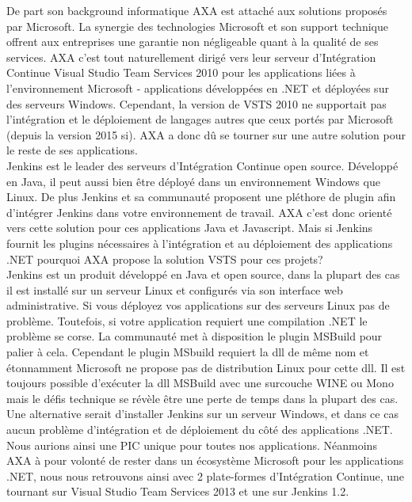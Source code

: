     De part son background informatique AXA est attaché aux solutions proposés par Microsoft. La synergie des technologies Microsoft et son support technique offrent aux entreprises une garantie non négligeable quant à la qualité de ses services. AXA c'est tout naturellement dirigé vers leur serveur d'Intégration Continue Visual Studio Team Services 2010 pour les applications liées à l'environnement Microsoft - applications développées en .NET et déployées sur des serveurs Windows. Cependant, la version de VSTS 2010 ne supportait pas l'intégration et le déploiement de langages autres que ceux portés par Microsoft (depuis la version 2015 si). AXA a donc dû se tourner sur une autre solution pour le reste de ses applications.\\

    Jenkins est le leader des serveurs d'Intégration Continue open source. Développé en Java, il peut aussi bien être déployé dans un environnement Windows que Linux. De plus Jenkins et sa communauté proposent une pléthore de plugin afin d'intégrer Jenkins dans votre environnement de travail. AXA c'est donc orienté vers cette solution pour ces applications Java et Javascript. Mais si Jenkins fournit les plugins nécessaires à l'intégration et au déploiement des applications .NET pourquoi AXA propose la solution VSTS pour ces projets?\\

    Jenkins est un produit développé en Java et open source, dans la plupart des cas il est installé sur un serveur Linux et configurés via son interface web administrative. Si vous déployez vos applications sur des serveurs Linux pas de problème. Toutefois, si votre application requiert une compilation .NET le problème se corse. La communauté met à disposition le plugin MSBuild pour palier à cela. Cependant le plugin MSbuild requiert la dll de même nom et étonnamment Microsoft ne propose pas de distribution Linux pour cette dll. Il est toujours possible d'exécuter la dll MSBuild avec une surcouche WINE ou Mono mais le défis technique se révèle être une perte de temps dans la plupart des cas.
    Une alternative serait d'installer Jenkins sur un serveur Windows, et dans ce cas aucun problème d'intégration et de déploiement du côté des applications .NET. Nous aurions ainsi une PIC unique pour toutes nos applications. Néanmoins AXA à pour volonté de rester dans un écosystème Microsoft pour les applications .NET, nous nous retrouvons ainsi avec 2 plate-formes d'Intégration Continue, une tournant sur Visual Studio Team Services 2013 et une sur Jenkins 1.2.\\

